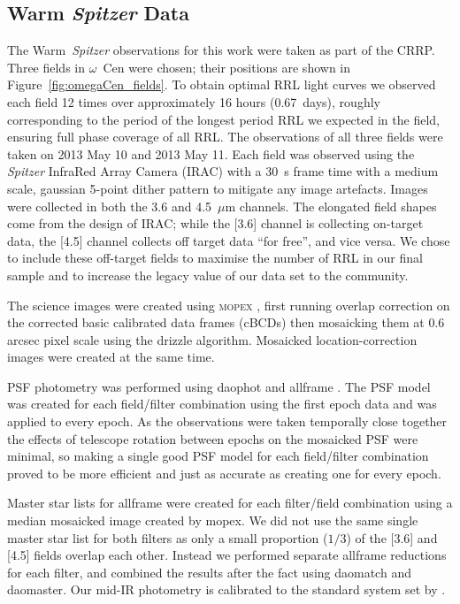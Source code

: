 \documentclass[a4paper,fleqn,usenatbib]{mnras}
\begin{document}
\subsection{Warm {\em Spitzer} Data}
\label{sec:spitzer_reduction}
The Warm~\textit{Spitzer} observations for this work were taken as part of the CRRP. Three fields in $\omega$~Cen were chosen; their positions are shown in Figure~\ref{fig:omegaCen_fields}. To obtain optimal RRL light curves we observed each field 12 times over approximately 16 hours (0.67~days), roughly corresponding to the period of the longest period RRL we expected in the field, ensuring full phase coverage of all RRL. The observations of all three fields were taken on 2013 May 10 and 2013 May 11. Each field was observed using the {\it Spitzer} InfraRed Array Camera (IRAC) \citep{2004ApJS..154...10F} with a 30~s frame time with a medium scale, gaussian 5-point dither pattern to mitigate any image artefacts. Images were collected in both the 3.6 and 4.5~$\mu$m channels. 
The elongated field shapes come from the design of IRAC; while the [3.6] channel is collecting on-target data, the [4.5] channel collects off target data ``for free'', and vice versa. We chose to include these off-target fields to maximise the number of RRL in our final sample and to increase the legacy value of our data set to the community. 

The science images were created using \textsc{mopex} \citep{2006SPIE.6274E..0CM}, first running overlap correction on the corrected basic calibrated data frames (cBCDs) then mosaicking them at 0.6 arcsec pixel scale using the drizzle algorithm. Mosaicked location-correction images were created at the same time. 

PSF photometry was performed using {\sc daophot} and {\sc allframe} \citep{1987PASP...99..191S, 1994PASP..106..250S}. The PSF model was created for each field/filter combination using the first epoch data and was applied to every epoch. As the observations were taken temporally close together the effects of telescope rotation between epochs on the mosaicked PSF were minimal, so making a single good PSF model for each field/filter combination proved to be more efficient and just as accurate as creating one for every epoch. 

Master star lists for {\sc allframe} were created for each filter/field combination using a median mosaicked image created by {\sc mopex}. We did not use the same single master star list for both filters as only a small proportion ($1/3$) of the [3.6] and [4.5] fields overlap each other. Instead we performed separate {\sc allframe} reductions for each filter, and combined the results after the fact using {\sc daomatch} and {\sc daomaster}. Our mid-IR photometry is calibrated to the standard system set by \citet{2005PASP..117..978R}.
\end{document}
